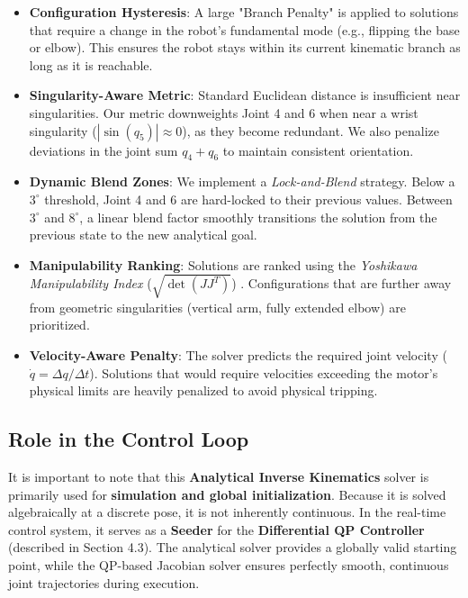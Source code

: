 \documentclass[12pt,a4paper]{report}
\begin{document}
\begin{itemize}
    \item \textbf{Configuration Hysteresis}: A large "Branch Penalty" is applied to solutions that require a change in the robot's fundamental mode (e.g., flipping the base or elbow). This ensures the robot stays within its current kinematic branch as long as it is reachable.
    \item \textbf{Singularity-Aware Metric}: Standard Euclidean distance is insufficient near singularities. Our metric downweights Joint 4 and 6 when near a wrist singularity ($|\sin(q_5)| \approx 0$), as they become redundant. We also penalize deviations in the joint sum $q_4 + q_6$ to maintain consistent orientation.
    \item \textbf{Dynamic Blend Zones}: We implement a \textit{Lock-and-Blend} strategy. Below a $3^\circ$ threshold, Joint 4 and 6 are hard-locked to their previous values. Between $3^\circ$ and $8^\circ$, a linear blend factor smoothly transitions the solution from the previous state to the new analytical goal.
    \item \textbf{Manipulability Ranking}: Solutions are ranked using the \textit{Yoshikawa Manipulability Index} ($\sqrt{\det(J J^T)}$) \cite{mathworks}. Configurations that are further away from geometric singularities (vertical arm, fully extended elbow) are prioritized.
    \item \textbf{Velocity-Aware Penalty}: The solver predicts the required joint velocity ($\dot{q} = \Delta q / \Delta t$). Solutions that would require velocities exceeding the motor's physical limits are heavily penalized to avoid physical tripping.
\end{itemize}

\subsection{Role in the Control Loop}

It is important to note that this \textbf{Analytical Inverse Kinematics} solver \cite{EAIK} is primarily used for \textbf{simulation and global initialization}. Because it is solved algebraically at a discrete pose, it is not inherently continuous. In the real-time control system, it serves as a \textbf{Seeder} for the \textbf{Differential QP Controller} (described in Section 4.3). The analytical solver provides a globally valid starting point, while the QP-based Jacobian solver ensures perfectly smooth, continuous joint trajectories during execution.
\end{document}
